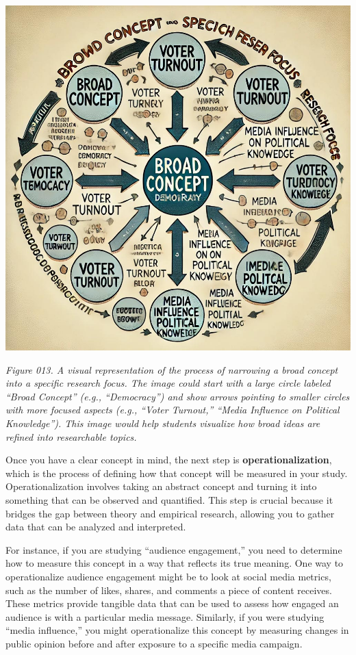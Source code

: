\documentclass[
]{book}
\begin{document}
\includegraphics[width=1\textwidth,height=\textheight]{images/fig013.jpg}

\emph{Figure 013. A visual representation of the process of narrowing a broad concept into a specific research focus. The image could start with a large circle labeled ``Broad Concept'' (e.g., ``Democracy'') and show arrows pointing to smaller circles with more focused aspects (e.g., ``Voter Turnout,'' ``Media Influence on Political Knowledge''). This image would help students visualize how broad ideas are refined into researchable topics.}

Once you have a clear concept in mind, the next step is \textbf{operationalization}, which is the process of defining how that concept will be measured in your study. Operationalization involves taking an abstract concept and turning it into something that can be observed and quantified. This step is crucial because it bridges the gap between theory and empirical research, allowing you to gather data that can be analyzed and interpreted.

For instance, if you are studying ``audience engagement,'' you need to determine how to measure this concept in a way that reflects its true meaning. One way to operationalize audience engagement might be to look at social media metrics, such as the number of likes, shares, and comments a piece of content receives. These metrics provide tangible data that can be used to assess how engaged an audience is with a particular media message. Similarly, if you were studying ``media influence,'' you might operationalize this concept by measuring changes in public opinion before and after exposure to a specific media campaign.
\end{document}
